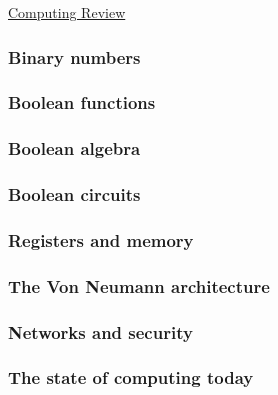 \documentclass[main.tex]{subfiles}
\begin{document}
\href{https://www2.seas.gwu.edu/~simhaweb/quantum/modules/review/comp-review/comp-review.html}{Computing Review}

\subsubsection{Binary numbers}

\subsubsection{Boolean functions}

\subsubsection{Boolean algebra}

\subsubsection{Boolean circuits}

\subsubsection{Registers and memory}

\subsubsection{The Von Neumann architecture}

\subsubsection{Networks and security}

\subsubsection{The state of computing today}
\end{document}
